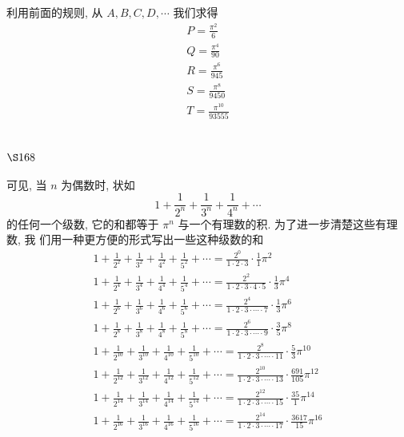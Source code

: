 利用前面的规则, 从 $A, B, C, D, \cdots$ 我们求得
\[
\begin{array}{r}
P=\frac{\pi^{2}}{6} \\
Q=\frac{\pi^{4}}{90} \\
R=\frac{\pi^{6}}{945} \\
S=\frac{\pi^{8}}{9450} \\
T=\frac{\pi^{10}}{93555}
\end{array}
\]
\section{$\S 168$}

可见, 当 $n$ 为偶数时, 状如
\[
1+\frac{1}{2^{n}}+\frac{1}{3^{n}}+\frac{1}{4^{n}}+\cdots
\]
的任何一个级数, 它的和都等于 $\pi^{n}$ 与一个有理数的积. 为了进一步清楚这些有理数, 我 们用一种更方便的形式写出一些这种级数的和
\[
\begin{gathered}
1+\frac{1}{2^{2}}+\frac{1}{3^{2}}+\frac{1}{4^{2}}+\frac{1}{5^{2}}+\cdots=\frac{2^{0}}{1 \cdot 2 \cdot 3} \cdot \frac{1}{1} \pi^{2} \\
1+\frac{1}{2^{4}}+\frac{1}{3^{4}}+\frac{1}{4^{4}}+\frac{1}{5^{4}}+\cdots=\frac{2^{2}}{1 \cdot 2 \cdot 3 \cdot 4 \cdot 5} \cdot \frac{1}{3} \pi^{4} \\
1+\frac{1}{2^{6}}+\frac{1}{3^{6}}+\frac{1}{4^{6}}+\frac{1}{5^{6}}+\cdots=\frac{2^{4}}{1 \cdot 2 \cdot 3 \cdot \cdots \cdot 7} \cdot \frac{1}{3} \pi^{6} \\
1+\frac{1}{2^{8}}+\frac{1}{3^{8}}+\frac{1}{4^{8}}+\frac{1}{5^{8}}+\cdots=\frac{2^{6}}{1 \cdot 2 \cdot 3 \cdot \cdots \cdot 9} \cdot \frac{3}{5} \pi^{8} \\
1+\frac{1}{2^{10}}+\frac{1}{3^{10}}+\frac{1}{4^{10}}+\frac{1}{5^{10}}+\cdots=\frac{2^{8}}{1 \cdot 2 \cdot 3 \cdot \cdots \cdot 11} \cdot \frac{5}{3} \pi^{10} \\
1+\frac{1}{2^{12}}+\frac{1}{3^{12}}+\frac{1}{4^{12}}+\frac{1}{5^{12}}+\cdots=\frac{2^{10}}{1 \cdot 2 \cdot 3 \cdot \cdots \cdot 13} \cdot \frac{691}{105} \pi^{12} \\
1+\frac{1}{2^{14}}+\frac{1}{3^{14}}+\frac{1}{4^{14}}+\frac{1}{5^{14}}+\cdots=\frac{2^{12}}{1 \cdot 2 \cdot 3 \cdot \cdots \cdot 15} \cdot \frac{35}{1} \pi^{14} \\
1+\frac{1}{2^{16}}+\frac{1}{3^{16}}+\frac{1}{4^{16}}+\frac{1}{5^{16}}+\cdots=\frac{2^{14}}{1 \cdot 2 \cdot 3 \cdot \cdots \cdot 17} \cdot \frac{3617}{15} \pi^{16}
\end{gathered}
\]
